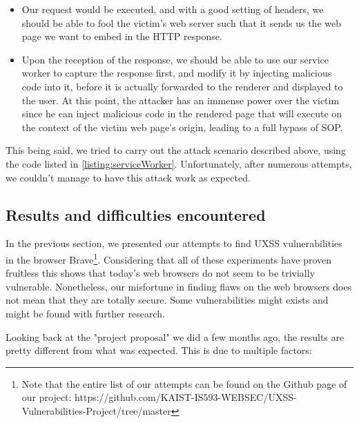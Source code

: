 \documentclass[journal]{IEEEtran}
\begin{document}
\begin{itemize}
\item Our request would be executed, and with a good setting of headers, we should be able to fool the victim's web server such that it sends us the web page we want to embed in the HTTP response.
\item Upon the reception of the response, we should be able to use our service worker to capture the response first, and modify it by injecting malicious code into it, before it is actually forwarded to the renderer and displayed to the user. At this point, the attacker has an immense power over the victim since he can inject malicious code in the rendered page that will execute on the context of the victim web page's origin, leading to a full bypass of SOP.
\end{itemize}

\medskip

This being said, we tried to carry out the attack scenario described above, using the code listed in \ref{listing:serviceWorker}. Unfortunately, after numerous attempts, we couldn't manage to have this attack work as expected.


\subsection{Results and difficulties encountered}

In the previous section, we presented our attempts to find UXSS vulnerabilities in the browser Brave\footnote{Note that the entire list of our attempts can be found on the Github page of our project: https://github.com/KAIST-IS593-WEBSEC/UXSS-Vulnerabilities-Project/tree/master}. Considering that all of these experiments have proven fruitless this shows that today's web browsers do not seem to be trivially vulnerable. Nonetheless, our misfortune in finding flaws on the web browsers does not mean that they are totally secure. Some vulnerabilities might exists and might be found with further research.

\medskip

Looking back at the "project proposal" we did a few months ago, the results are pretty different from what was expected. This is due to multiple factors:
\end{document}
